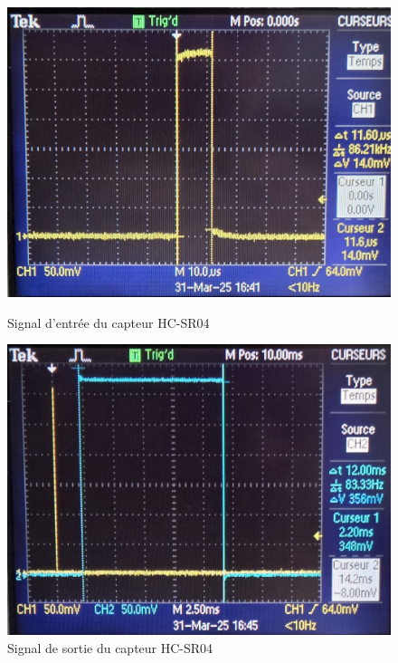 \documentclass{article}
\begin{document}
    \begin{figure}[htbp]
        \centering
        \begin{minipage}{0.45\textwidth}
            \centering
            \includegraphics[width=\textwidth]{img/input_sr-04.jpg}
            \caption{Signal d'entrée du capteur HC-SR04}
            \label{fig:input_sr-04}
        \end{minipage}
        \hfill
        \begin{minipage}{0.45\textwidth}
            \centering
            \includegraphics[width=\textwidth]{img/output_sr-04.jpg}
            \caption{Signal de sortie du capteur HC-SR04}
            \label{fig:output_sr-04}
        \end{minipage}
    \end{figure}
\end{document}
